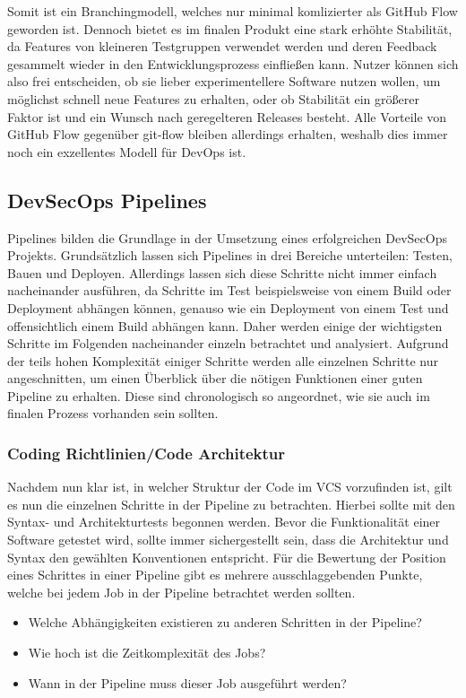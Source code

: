 Somit ist ein Branchingmodell, welches nur minimal komlizierter als GitHub Flow geworden ist.
Dennoch bietet es im finalen Produkt eine stark erhöhte Stabilität, da Features von kleineren Testgruppen verwendet werden und deren Feedback gesammelt wieder in den Entwicklungsprozess einfließen kann.
Nutzer können sich also frei entscheiden, ob sie lieber experimentellere Software nutzen wollen, um möglichst schnell neue Features zu erhalten, oder ob Stabilität ein größerer Faktor ist und ein Wunsch nach geregelteren Releases besteht.
Alle Vorteile von GitHub Flow gegenüber git-flow bleiben allerdings erhalten, weshalb dies immer noch ein exzellentes Modell für DevOps ist.

\subsection{DevSecOps Pipelines}

Pipelines bilden die Grundlage in der Umsetzung eines erfolgreichen DevSecOps Projekts.
Grundsätzlich lassen sich Pipelines in drei Bereiche unterteilen: Testen, Bauen und Deployen.
Allerdings lassen sich diese Schritte nicht immer einfach nacheinander ausführen, da Schritte im Test beispielsweise von einem Build oder Deployment abhängen können, genauso wie ein Deployment von einem Test und offensichtlich einem Build abhängen kann.
Daher werden einige der wichtigsten Schritte im Folgenden nacheinander einzeln betrachtet und analysiert.
Aufgrund der teils hohen Komplexität einiger Schritte werden alle einzelnen Schritte nur angeschnitten, um einen Überblick über die nötigen Funktionen einer guten Pipeline zu erhalten.
Diese sind chronologisch so angeordnet, wie sie auch im finalen Prozess vorhanden sein sollten.

\subsubsection{Coding Richtlinien/Code Architektur}\label{subsubsec:codingguidelines/codearchitecture}

Nachdem nun klar ist, in welcher Struktur der Code im VCS vorzufinden ist, gilt es nun die einzelnen Schritte in der Pipeline zu betrachten.
Hierbei sollte mit den Syntax- und Architekturtests begonnen werden.
Bevor die Funktionalität einer Software getestet wird, sollte immer sichergestellt sein, dass die Architektur und Syntax den gewählten Konventionen entspricht.
Für die Bewertung der Position eines Schrittes in einer Pipeline gibt es mehrere ausschlaggebenden Punkte, welche bei jedem Job in der Pipeline betrachtet werden sollten.
\begin{itemize}
    \item Welche Abhängigkeiten existieren zu anderen Schritten in der Pipeline?
    \item Wie hoch ist die Zeitkomplexität des Jobs?
    \item Wann in der Pipeline muss dieser Job ausgeführt werden?
\end{itemize}

